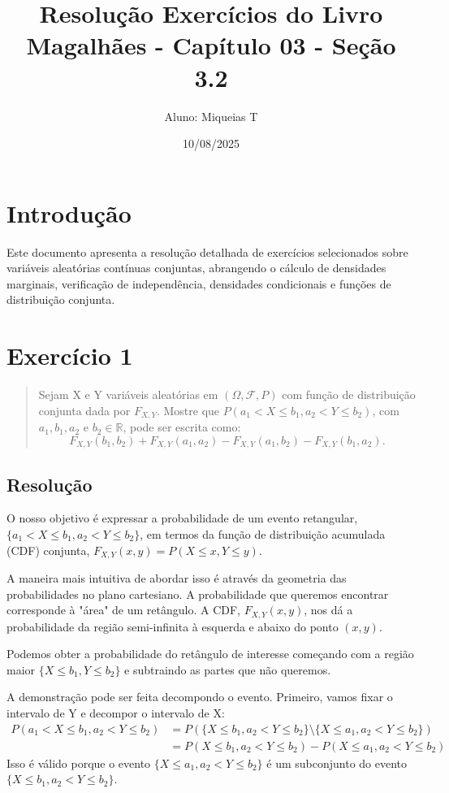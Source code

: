 \documentclass[12pt]{article}
\title{Resolução Exercícios do Livro Magalhães - Capítulo 03 - Seção 3.2}
\author{Aluno: Miqueias T}
\date{10/08/2025}
\begin{document}
\maketitle

\section*{Introdução}
Este documento apresenta a resolução detalhada de exercícios selecionados sobre variáveis aleatórias contínuas conjuntas, abrangendo o cálculo de densidades marginais, verificação de independência, densidades condicionais e funções de distribuição conjunta.

\section{Exercício 1}

\begin{quote}
Sejam X e Y variáveis aleatórias em $(\Omega, \mathcal{F}, P)$ com função de distribuição conjunta dada por $F_{X,Y}$. Mostre que $P(a_1 < X \le b_1, a_2 < Y \le b_2)$, com $a_1, b_1, a_2$ e $b_2 \in \mathbb{R}$, pode ser escrita como:
\[ F_{X,Y}(b_1, b_2) + F_{X,Y}(a_1, a_2) - F_{X,Y}(a_1, b_2) - F_{X,Y}(b_1, a_2). \]
\end{quote}

\subsection*{Resolução}

O nosso objetivo é expressar a probabilidade de um evento retangular, $\{a_1 < X \le b_1, a_2 < Y \le b_2\}$, em termos da função de distribuição acumulada (CDF) conjunta, $F_{X,Y}(x,y) = P(X \le x, Y \le y)$.

A maneira mais intuitiva de abordar isso é através da geometria das probabilidades no plano cartesiano. A probabilidade que queremos encontrar corresponde à "área" de um retângulo. A CDF, $F_{X,Y}(x,y)$, nos dá a probabilidade da região semi-infinita à esquerda e abaixo do ponto $(x,y)$.

Podemos obter a probabilidade do retângulo de interesse começando com a região maior $\{X \le b_1, Y \le b_2\}$ e subtraindo as partes que não queremos.

A demonstração pode ser feita decompondo o evento. Primeiro, vamos fixar o intervalo de Y e decompor o intervalo de X:
\begin{align*}
P(a_1 < X \le b_1, a_2 < Y \le b_2) &= P(\{X \le b_1, a_2 < Y \le b_2\} \setminus \{X \le a_1, a_2 < Y \le b_2\}) \\
&= P(X \le b_1, a_2 < Y \le b_2) - P(X \le a_1, a_2 < Y \le b_2)
\end{align*}
Isso é válido porque o evento $\{X \le a_1, a_2 < Y \le b_2\}$ é um subconjunto do evento $\{X \le b_1, a_2 < Y \le b_2\}$.
\end{document}
